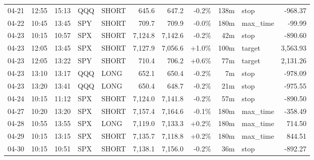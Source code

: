 \documentclass[11pt,a4paper,twoside]{article}
\begin{document}
\begin{center}
\begin{longtable}{>{\color{txtmain}}l l l l l r r r r >{\color{txtmain}}l r}
04-21 & 12:55 & 15:13 & QQQ & SHORT & 645.6 & 647.2 & \textcolor{lossred}{-0.2\%} & 138m & stop & \textcolor{lossred}{-968.37} \\
04-22 & 10:45 & 13:45 & SPY & SHORT & 709.7 & 709.9 & \textcolor{lossred}{-0.0\%} & 180m & max\_time & \textcolor{lossred}{-99.99} \\
04-23 & 10:15 & 10:57 & SPX & SHORT & 7,124.8 & 7,142.6 & \textcolor{lossred}{-0.2\%} & 42m & stop & \textcolor{lossred}{-890.60} \\
04-23 & 12:05 & 13:45 & SPX & SHORT & 7,127.9 & 7,056.6 & \textcolor{wingreen}{+1.0\%} & 100m & target & \textcolor{wingreen}{3,563.93} \\
04-23 & 12:05 & 13:22 & SPY & SHORT & 710.4 & 706.2 & \textcolor{wingreen}{+0.6\%} & 77m & target & \textcolor{wingreen}{2,131.26} \\
04-23 & 13:10 & 13:17 & QQQ & LONG & 652.1 & 650.4 & \textcolor{lossred}{-0.2\%} & 7m & stop & \textcolor{lossred}{-978.09} \\
04-23 & 13:20 & 13:41 & QQQ & LONG & 650.4 & 648.7 & \textcolor{lossred}{-0.2\%} & 21m & stop & \textcolor{lossred}{-975.55} \\
04-24 & 10:15 & 11:12 & SPX & SHORT & 7,124.0 & 7,141.8 & \textcolor{lossred}{-0.2\%} & 57m & stop & \textcolor{lossred}{-890.50} \\
04-27 & 10:20 & 13:20 & SPX & SHORT & 7,157.4 & 7,164.6 & \textcolor{lossred}{-0.1\%} & 180m & max\_time & \textcolor{lossred}{-358.49} \\
04-28 & 10:55 & 13:55 & SPX & LONG & 7,119.0 & 7,133.3 & \textcolor{wingreen}{+0.2\%} & 180m & max\_time & \textcolor{wingreen}{714.50} \\
04-29 & 10:15 & 13:15 & SPX & SHORT & 7,135.7 & 7,118.8 & \textcolor{wingreen}{+0.2\%} & 180m & max\_time & \textcolor{wingreen}{844.51} \\
04-30 & 10:15 & 10:51 & SPX & SHORT & 7,138.1 & 7,156.0 & \textcolor{lossred}{-0.2\%} & 36m & stop & \textcolor{lossred}{-892.27} \\
\end{longtable}
\end{center}
\clearpage
\end{document}
